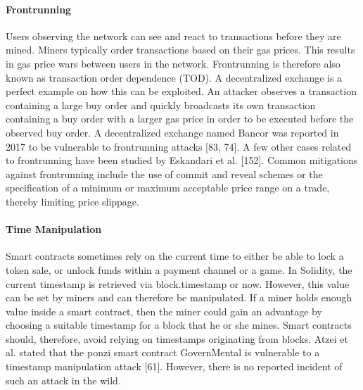         \paragraph{Frontrunning}
            Users observing the network can see and react to transactions before they are mined. Miners typically order transactions based on their gas prices.
            This results in gas price wars between users in the network.
            Frontrunning is therefore also known as transaction order dependence (TOD).
            A decentralized exchange is a perfect example on how this can be exploited. An attacker observes a transaction containing a large buy order and quickly broadcasts its own transaction containing a buy order with a larger gas price in order to be executed before the observed buy order.
            A decentralized exchange named Bancor was reported in 2017 to be vulnerable to frontrunning attacks [83, 74].
            A few other cases related to frontrunning have been studied by Eskandari et al. [152].
            Common mitigations against frontrunning include the use of commit and reveal schemes or the specification of a minimum or maximum acceptable price range on a trade, thereby limiting price slippage.
        \paragraph{Time Manipulation}
            Smart contracts sometimes rely on the current time to either be able to lock a token sale, or unlock funds within a payment channel or a game.
            In Solidity, the current timestamp is retrieved via block.timestamp or now.
            However, this value can be set by miners and can therefore be manipulated.
            If a miner holds enough value inside a smart contract, then the miner could gain an advantage by choosing a suitable timestamp for a block that he or she mines.
            Smart contracts should, therefore, avoid relying on timestamps originating from blocks.
            Atzei et al. stated that the ponzi smart contract GovernMental is vulnerable to a timestamp manipulation attack [61].
            However, there is no reported incident of such an attack in the wild.
